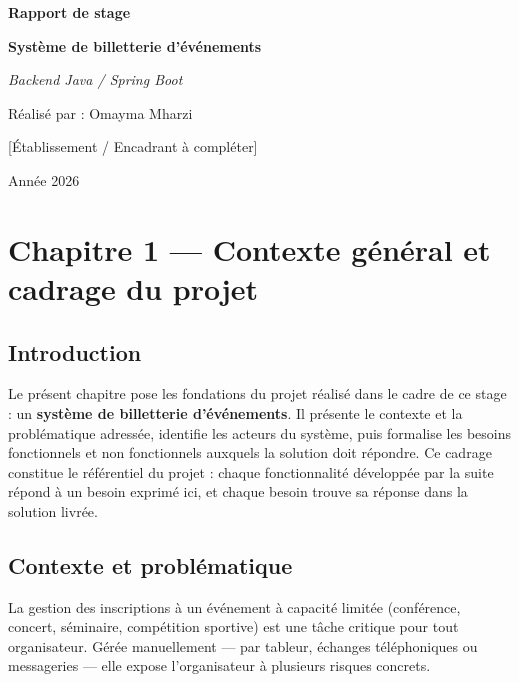 \documentclass[12pt,a4paper]{report}
\begin{document}
\begin{titlepage}
\centering
\vspace*{4cm}
{\Huge\bfseries\color{bleuprincipal} Rapport de stage\par}
\vspace{1cm}
{\LARGE\bfseries\color{bleusecondaire} Système de billetterie d'événements\par}
\vspace{0.5cm}
{\Large\itshape\color{grisfonce} Backend Java / Spring Boot\par}
\vspace{3cm}
{\Large Réalisé par : Omayma Mharzi\par}
\vspace{0.5cm}
{\large\color{grisfonce} [Établissement / Encadrant à compléter]\par}
\vspace{0.5cm}
{\large Année 2026\par}
\vfill
\end{titlepage}

\tableofcontents
\newpage

\chapter{Chapitre 1 — Contexte général et cadrage du projet}

\section{Introduction}

Le présent chapitre pose les fondations du projet réalisé dans le cadre de ce stage : un \textbf{système de billetterie d'événements}. Il présente le contexte et la problématique adressée, identifie les acteurs du système, puis formalise les besoins fonctionnels et non fonctionnels auxquels la solution doit répondre. Ce cadrage constitue le référentiel du projet : chaque fonctionnalité développée par la suite répond à un besoin exprimé ici, et chaque besoin trouve sa réponse dans la solution livrée.

\section{Contexte et problématique}

La gestion des inscriptions à un événement à capacité limitée (conférence, concert, séminaire, compétition sportive) est une tâche critique pour tout organisateur. Gérée manuellement — par tableur, échanges téléphoniques ou messageries — elle expose l'organisateur à plusieurs risques concrets.
\end{document}
